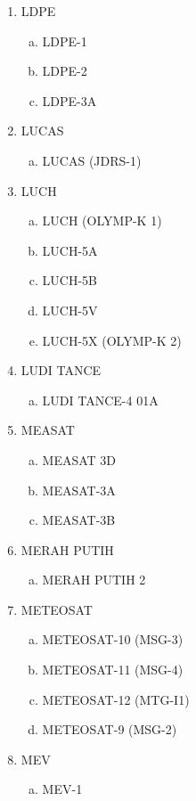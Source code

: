 \begin{multicols}{2}
\begin{enumerate}
\begin{enumerate}[a.]
  \end{enumerate}
  \item LDPE
  \begin{enumerate}[a.]
    \item LDPE-1
    \item LDPE-2
    \item LDPE-3A
  \end{enumerate}
  \item LUCAS
  \begin{enumerate}[a.]
    \item LUCAS (JDRS-1)
  \end{enumerate}
  \item LUCH
  \begin{enumerate}[a.]
    \item LUCH (OLYMP-K 1)
    \item LUCH-5A
    \item LUCH-5B
    \item LUCH-5V
    \item LUCH-5X (OLYMP-K 2)
  \end{enumerate}
  \item LUDI TANCE
  \begin{enumerate}[a.]
    \item LUDI TANCE-4 01A
  \end{enumerate}
  \item MEASAT
  \begin{enumerate}[a.]
    \item MEASAT 3D
    \item MEASAT-3A
    \item MEASAT-3B
  \end{enumerate}
  \item MERAH PUTIH
  \begin{enumerate}[a.]
    \item MERAH PUTIH 2
  \end{enumerate}
  \item METEOSAT
  \begin{enumerate}[a.]
    \item METEOSAT-10 (MSG-3)
    \item METEOSAT-11 (MSG-4)
    \item METEOSAT-12 (MTG-I1)
    \item METEOSAT-9 (MSG-2)
  \end{enumerate}
  \item MEV
  \begin{enumerate}[a.]
    \item MEV-1

\end{enumerate}
\end{enumerate}
\end{multicols}
